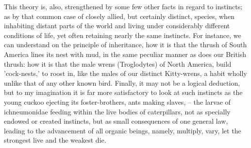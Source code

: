 \indent This theory is, also, strengthened by some few other facts in regard to instincts; as by that common case of closely allied, but certainly distinct, species, when inhabiting distant parts of the world and living under considerably different conditions of life, yet often retaining nearly the same instincts. For instance, we can understand on the principle of inheritance, how it is that the thrush of South America lines its nest with mud, in the same peculiar manner as does our British thrush: how it is that the male wrens (Troglodytes) of North America, build 'cock-nests,' to roost in, like the males of our distinct Kitty-wrens, a habit wholly unlike that of any other known bird. Finally, it may not be a logical deduction, but to my imagination it is far more satisfactory to look at such instincts as the young cuckoo ejecting its foster-brothers, ants making slaves, -- the larvae of ichneumonidae feeding within the live bodies of caterpillars, not as specially endowed or created instincts, but as small consequences of one general law, leading to the advancement of all organic beings, namely, multiply, vary, let the strongest live and the weakest die.\\